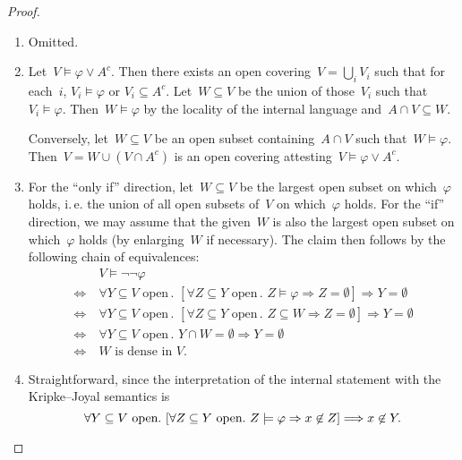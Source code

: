 \documentclass[10pt]{amsart}
\makeatletter
\theoremstyle{definition}
\theoremstyle{plain}
\theoremstyle{remark}
\newcommand{\?}{\,{:}\,}
\renewcommand{\_}{\mathpunct{.}\,}
\newcommand{\ie}{i.\,e.\@\xspace}
\makeatother
\begin{document}
\begin{proof}
\begin{enumerate}
\item Omitted.

\item Let~$V \models \varphi \vee A^c$. Then there exists an open covering~$V =
\bigcup_i V_i$ such that for each~$i$, $V_i \models \varphi$ or $V_i \subseteq
A^c$. Let~$W \subseteq V$ be the union of those~$V_i$ such that~$V_i \models \varphi$.
Then~$W \models \varphi$ by the locality of the internal language and~$A \cap V
\subseteq W$.

Conversely, let~$W \subseteq V$ be an open subset containing~$A \cap V$ such
that~$W \models \varphi$. Then~$V = W \cup (V \cap A^c)$ is an open covering
attesting~$V \models \varphi \vee A^c$.

\item For the ``only if'' direction, let~$W \subseteq V$ be the largest
open subset on which~$\varphi$ holds, \ie the union of all open subsets
of~$V$ on which~$\varphi$ holds. For the ``if'' direction, we may assume that
the given~$W$ is also the largest open subset on which~$\varphi$ holds (by
enlarging~$W$ if necessary). The claim then follows by the following chain of
equivalences:
\begin{align*}
  &\ V \models \neg\neg\varphi \\
  \Longleftrightarrow&\ \forall \text{$Y \subseteq V$ open}\_
    \left[\forall \text{$Z \subseteq Y$ open}\_ Z \models \varphi \Rightarrow Z
    = \emptyset\right] \Longrightarrow Y = \emptyset \\
  \Longleftrightarrow&\ \forall \text{$Y \subseteq V$ open}\_
    \left[\forall \text{$Z \subseteq Y$ open}\_ Z \subseteq W \Rightarrow Z
    = \emptyset\right] \Longrightarrow Y = \emptyset \\
  \Longleftrightarrow&\ \forall \text{$Y \subseteq V$ open}\_
    Y \cap W = \emptyset \Longrightarrow Y = \emptyset \\
  \Longleftrightarrow&\ \text{$W$ is dense in~$V$.}
\end{align*}

\item Straightforward, since the interpretation of the internal statement with
the Kripke--Joyal semantics is
\[ \forall \text{$Y \subseteq V$ open}\_
  \left[\forall \text{$Z \subseteq Y$ open}\_
    Z \models \varphi \Rightarrow x \not\in Z\right] \Longrightarrow x \not\in
    Y. \qedhere \]
\end{enumerate}
\end{proof}
\end{document}
